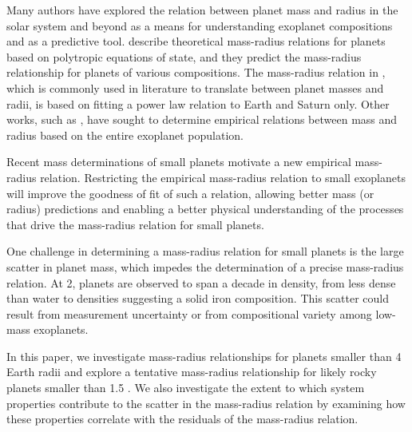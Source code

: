 \documentclass[iop]{emulateapj}
\begin{document}
Many authors have explored the relation between planet mass and radius in the solar system and beyond as a means for understanding exoplanet compositions and as a predictive tool.  \citet{Seager2007} describe theoretical mass-radius relations for planets based on polytropic equations of state, and they predict the mass-radius relationship for  planets of various compositions.  The mass-radius relation in \citet{Lissauer2011}, which is commonly used in literature to translate between planet masses and radii, is based on fitting a power law relation to Earth and Saturn only.  Other works, such as \citet{Enoch2012, Kane2012, Weiss2013}, have sought to determine empirical relations between mass and radius based on the entire exoplanet population.  

Recent mass determinations of small planets motivate a new empirical mass-radius relation.  Restricting the empirical mass-radius relation to small exoplanets will improve the goodness of fit of such a relation, allowing better mass (or radius) predictions and enabling a better physical understanding of the processes that drive the mass-radius relation for small planets.  

One challenge in determining a mass-radius relation for small planets is the large scatter in planet mass, which impedes the determination of a precise mass-radius relation.  At 2\rearth, planets are observed to span a decade in density, from less dense than water to densities suggesting a solid iron composition.  This scatter could result from measurement uncertainty or from compositional variety among low-mass exoplanets.

In this paper, we investigate mass-radius relationships for planets smaller than 4 Earth radii and explore a tentative mass-radius relationship for likely rocky planets smaller than 1.5 \rearth.  We also investigate the extent to which system properties contribute to the scatter in the mass-radius relation by examining how these properties correlate with the residuals of the mass-radius relation.

\end{document}
